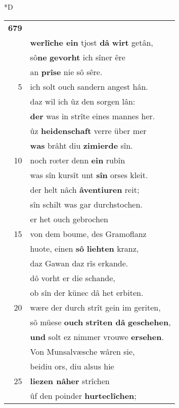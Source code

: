 \documentclass[8pt,a4paper,notitlepage]{article}
\begin{document}
\begin{table}[ht]
\begin{minipage}[t]{0.5\linewidth}
\small
\begin{center}*D
\end{center}
\begin{tabular}{rl}
\textbf{679} & \textbf{\textit{\begin{large}O\end{large}}b} von dem werden Gawan\\ 
 & \textbf{werlîche ein} tjost \textbf{dâ} \textbf{wirt} getân,\\ 
 & sô\textbf{ne} \textbf{gevorht} ich sîner êre\\ 
 & an \textbf{prîse} nie sô sêre.\\ 
5 & ich solt ouch sandern angest hân.\\ 
 & daz wil ich ûz den sorgen lân:\\ 
 & \textbf{der} was in strîte eines mannes her.\\ 
 & ûz \textbf{heidenschaft} verre über mer\\ 
 & \textbf{was} brâht diu \textbf{zimierde} sîn.\\ 
10 & noch rœter denn \textbf{ein} rubîn\\ 
 & was sîn kursît unt \textbf{sîn} orses kleit.\\ 
 & der helt nâch \textbf{âventiuren} reit;\\ 
 & sîn schilt was gar durchstochen.\\ 
 & er het ouch gebrochen\\ 
15 & von dem boume, des Gramoflanz\\ 
 & huote, einen \textbf{sô} \textbf{liehten} kranz,\\ 
 & daz Gawan daz rîs erkande.\\ 
 & dô vorht er die schande,\\ 
 & ob sîn der künec dâ het erbiten.\\ 
20 & wære der durch strît gein im geriten,\\ 
 & sô müese \textbf{ouch} \textbf{strîten dâ} \textbf{geschehen},\\ 
 & \textbf{und} solt ez nimmer vrouwe \textbf{ersehen}.\\ 
 & Von Munsalvæsche wâren sie,\\ 
 & beidiu ors, diu alsus hie\\ 
25 & \textbf{liezen nâher} strîchen\\ 
 & ûf den poinder \textbf{hurteclîchen};\\ 

\end{tabular}
\end{minipage}
\end{table}
\end{document}
